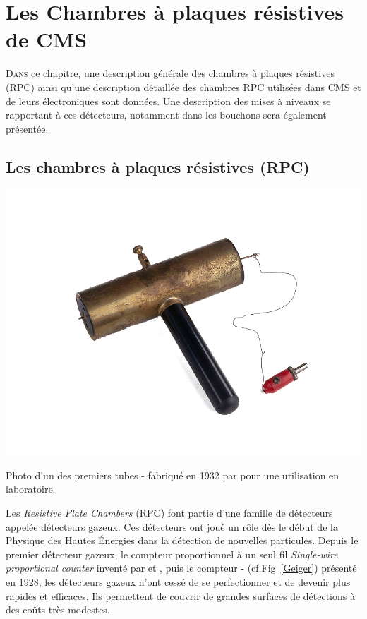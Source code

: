 \chapter{Les Chambres à plaques résistives de CMS}
\renewcommand\chapterillustration{RPC/rpc}
\ThisULCornerWallPaper{1}{\chapterillustration}
\minitoc

\lettrine[lines=4, slope=-0.5em]{D}{ans} ce chapitre, une description générale des chambres à plaques résistives (RPC) ainsi qu'une description détaillée des chambres RPC utilisées dans CMS et de leurs électroniques sont données. Une description des mises à niveaux se rapportant à ces détecteurs, notamment dans les bouchons sera également présentée.

\section{Les chambres à plaques résistives (RPC)}

 \marginpar
{
	\centering
	\includegraphics[width=\marginparwidth]{RPC/Geiger.png}
	\captionsetup{type=subfigure}\caption{Photo d'un des premiers tubes - fabriqué en \num{1932} par  pour une utilisation en laboratoire.}
	\label{Geiger}
}
Les \textit{Resistive Plate Chambers} (RPC) font partie d'une famille de détecteurs appelée détecteurs gazeux. Ces détecteurs ont joué un rôle dès le début de la Physique des Hautes Énergies dans la détection de nouvelles particules. Depuis le premier détecteur gazeux, le compteur proportionnel à un seul fil \textit{Single-wire proportional counter} inventé par  et , puis le compteur - (cf.Fig~\ref{Geiger}) présenté en \num{1928}, les détecteurs gazeux n'ont cessé de se perfectionner et de devenir plus rapides et efficaces. Ils permettent de couvrir de grandes surfaces de détections à des coûts très modestes.

